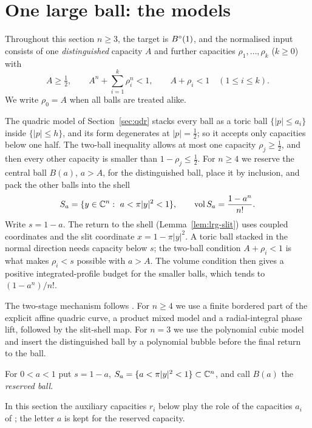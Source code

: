 \section{One large ball: the models}\label{sec:lrg}

Throughout this section $n\ge3$, the target is $B^{\circ}(1)$, and the normalised input consists of one
\emph{distinguished} capacity $A$ and further capacities $\rho_1,\dots,\rho_k$ ($k\ge0$) with
\begin{equation}\label{eq:lrg-input}
 A\ge\tfrac12,\qquad A^n+\sum_{i=1}^k\rho_i^n<1,\qquad A+\rho_i<1\quad(1\le i\le k).
\end{equation}
We write $\rho_0=A$ when all balls are treated alike.

The quadric model of Section~\ref{sec:qdr} stacks every ball as a toric ball $\{|p|\le a_i\}$ inside
$\{|p|\le h\}$, and its form degenerates at $|p|=\frac12$; so it accepts only capacities below one half. The
two-ball inequality allows at most one capacity $\rho_j\ge\frac12$, and then every other capacity is smaller than
$1-\rho_j\le\frac12$. For $n\ge4$ we reserve the central ball $B(a)$, $a>A$, for the distinguished ball, place it by
inclusion, and pack the other balls into the shell
\[
 S_a=\{y\in\C^n:\ a<\pi|y|^2<1\},\qquad \vol S_a=\frac{1-a^n}{n!}.
\]
Write $s=1-a$. The return to the shell (Lemma~\ref{lem:lrg-slit}) uses coupled coordinates and the slit coordinate
$x=1-\pi|y|^2$. A toric ball stacked in the normal direction needs capacity below $s$; the two-ball condition
$A+\rho_i<1$ is what makes $\rho_i<s$ possible with $a>A$. The volume condition then gives a positive
integrated-profile budget for the smaller balls, which tends to $(1-a^n)/n!$.

The two-stage mechanism follows \cite{OpenAI2026}. For $n\ge4$ we use a finite bordered part of the explicit
affine quadric curve, a product mixed model and a radial-integral phase lift, followed by the slit-shell map. For
$n=3$ we use the polynomial cubic model and insert the distinguished ball by a polynomial bubble before the final
return to the ball.

\begin{definition}\label{def:lrg-shell}
For $0<a<1$ put $s=1-a$, $S_a=\{a<\pi|y|^2<1\}\subset\mathbb{C}^n$, and call $B(a)$ the \emph{reserved ball}.
\end{definition}

In this section the auxiliary capacities $r_i$ below play the role of the capacities $a_i$ of
; the letter $a$ is kept for the reserved capacity.

